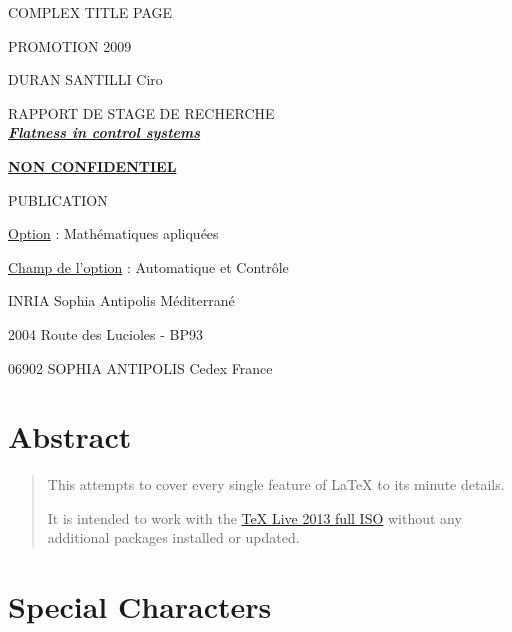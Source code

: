 \documentclass[12pt]{article}
\begin{document}
\begin{titlepage}
COMPLEX TITLE PAGE

PROMOTION 2009

DURAN SANTILLI Ciro

\vspace{40 mm}

\begin{center}

{\large RAPPORT DE STAGE DE RECHERCHE}\\[0.5cm]

\underline{ \large \bfseries \itshape Flatness in control systems}

\vspace{10 mm}

\underline{ \bfseries NON CONFIDENTIEL }

PUBLICATION

\end{center}

\vspace{40 mm}

\underline{Option} : Mathématiques apliquées

\underline{Champ de l'option} : Automatique et Contrôle

\vspace{5 mm}

INRIA Sophia Antipolis Méditerrané

2004 Route des Lucioles - BP93

06902 SOPHIA ANTIPOLIS Cedex France
\end{titlepage}

\newpage

\section{Abstract} \label{abstract}

\begin{abstract}
This attempts to cover every single feature of LaTeX to its minute details.

It is intended to work with the \href{https://www.tug.org/texlive/acquire-iso.html}{TeX Live 2013 full ISO} without any additional packages installed or updated.
\end{abstract}
\newpage

\section{Special Characters}
\end{document}
